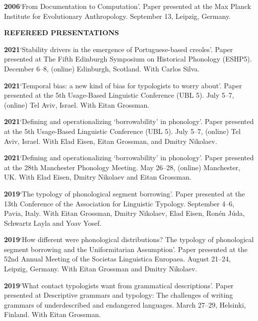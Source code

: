 \documentclass[11pt]{article}
\newcommand{\hangpara}{
 \setlength{\parindent}{0in} %
 \hangindent=0.42in %
}
\begin{document}
\vskip 6pt
\hangpara
{\bf 2006}\hspace{1ex}`From Documentation to Computation'. Paper presented at the Max Planck Institute for Evolutionary Anthropology. September 13, Leipzig, Germany.


\vskip 20pt
\begin{flushleft}
{\bf REFEREED PRESENTATIONS}
\end{flushleft}

\hangpara
{\bf 2021}\hspace{1ex}`Stability drivers in the emergence of Portuguese-based creoles'. Paper presented at The Fifth Edinburgh Symposium on Historical Phonology (ESHP5). December 6--8, (online) Edinburgh, Scotland. With Carlos Silva.

\hangpara
\vskip 6pt
{\bf 2021}\hspace{1ex}`Temporal bias: a new kind of bias for typologists to worry about'. Paper presented at the 5th Usage-Based Linguistic Conference (UBL 5). July 5--7, (online) Tel Aviv, Israel. With Eitan Grossman.

\hangpara
\vskip 6pt
{\bf 2021}\hspace{1ex}`Defining and operationalizing	 `borrowability' in phonology'. Paper presented at the 5th Usage-Based Linguistic Conference (UBL 5). July 5--7, (online) Tel Aviv, Israel. With Elad Eisen, Eitan Grossman, and Dmitry Nikolaev.

\hangpara
\vskip 6pt
{\bf 2021}\hspace{1ex}`Defining and operationalizing	 `borrowability' in phonology'. Paper presented at the 28th Manchester Phonology Meeting. May 26--28, (online) Manchester, UK. With Elad Eisen, Dmitry Nikolaev and Eitan Grossman.

\hangpara
\vskip 6pt
{\bf 2019}\hspace{1ex}`The typology of phonological segment borrowing'. Paper presented at the 
13th Conference of the Association for Linguistic Typology. September 4--6, Pavia, Italy. With Eitan Grossman, Dmitry Nikolaev, Elad Eisen, Ronén Júda, Schwartz Layla and Yoav Yosef.

\hangpara
\vskip 6pt
{\bf 2019}\hspace{1ex}`How different were phonological distributions?
The typology of phonological segment borrowing and the Uniformitarian
Assumption'. Paper presented at the 52nd Annual Meeting of the Societas Linguistica Europaea. August 21--24, Leipzig, Germany. With Eitan Grossman and Dmitry Nikolaev.

\hangpara
\vskip 6pt
{\bf 2019}\hspace{1ex}`What contact typologists want from grammatical descriptions'. Paper presented at Descriptive grammars and typology: The challenges of writing grammars of underdescribed and endangered languages. March 27--29, Helsinki, Finland. With Eitan Grossman.
\end{document}

